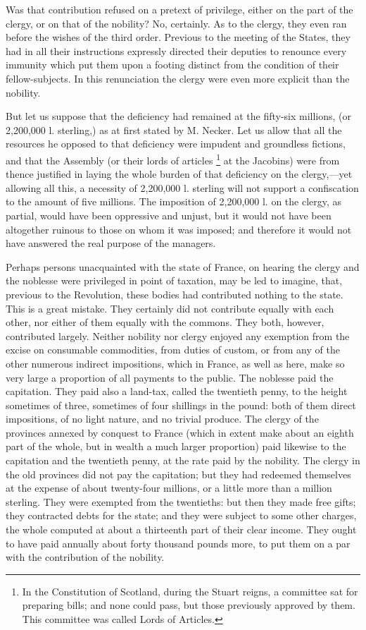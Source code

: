 Was that contribution refused on a pretext of privilege, either on the part of the clergy, or on that of the nobility? No, certainly. As to the clergy, they even ran before the wishes of the third order. Previous to the meeting of the States, they had in all their instructions expressly directed their deputies to renounce every immunity which put them upon a footing distinct from the condition of their fellow-subjects. In this renunciation the clergy were even more explicit than the nobility.

But let us suppose that the deficiency had remained at the fifty-six millions, (or 2,200,000 l. sterling,) as at first stated by M. Necker. Let us allow that all the resources he opposed to that deficiency were impudent and groundless fictions, and that the Assembly (or their lords of articles
\footnote{ In the Constitution of Scotland, during the Stuart reigns, a committee sat for preparing bills; and none could pass, but those previously approved by them. This committee was called Lords of Articles.}
 at the Jacobins) were from thence justified in laying the whole burden of that deficiency on the clergy,—yet allowing all this, a necessity of 2,200,000 l. sterling will not support a confiscation to the amount of five millions. The imposition of 2,200,000 l. on the clergy, as partial, would have been oppressive and unjust, but it would not have been altogether ruinous to those on whom it was imposed; and therefore it would not have answered the real purpose of the managers.

Perhaps persons unacquainted with the state of France, on hearing the clergy and the noblesse were privileged in point of taxation, may be led to imagine, that, previous to the Revolution, these bodies had contributed nothing to the state. This is a great mistake. They certainly did not contribute equally with each other, nor either of them equally with the commons. They both, however, contributed largely. Neither nobility nor clergy enjoyed any exemption from the excise on consumable commodities, from duties of custom, or from any of the other numerous indirect impositions, which in France, as well as here, make so very large a proportion of all payments to the public. The noblesse paid the capitation. They paid also a land-tax, called the twentieth penny, to the height sometimes of three, sometimes of four shillings in the pound: both of them direct impositions, of no light nature, and no trivial produce. The clergy of the provinces annexed by conquest to France (which in extent make about an eighth part of the whole, but in wealth a much larger proportion) paid likewise to the capitation and the twentieth penny, at the rate paid by the nobility. The clergy in the old provinces did not pay the capitation; but they had redeemed themselves at the expense of about twenty-four millions, or a little more than a million sterling. They were exempted from the twentieths: but then they made free gifts; they contracted debts for the state; and they were subject to some other charges, the whole computed at about a thirteenth part of their clear income. They ought to have paid annually about forty thousand pounds more, to put them on a par with the contribution of the nobility.

